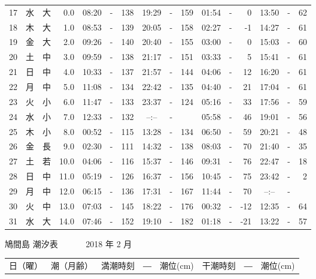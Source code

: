 \documentclass[12pt.a4j]{jsarticle}
\begin{document}
\begin{center}
\begin{table}[ht]
\begin{tabular}{|rc|cr|ccrccr|ccrccr|}
17 & 水 & 大 &  0.0 &  08:20 &-& 138  &  19:29 &-& 159  &   01:54 &-&   0  &   13:50 &-&  62  \\
18 & 木 & 大 &  1.0 &  08:53 &-& 139  &  20:05 &-& 158  &   02:27 &-&  -1  &   14:27 &-&  61  \\
19 & 金 & 大 &  2.0 &  09:26 &-& 140  &  20:40 &-& 155  &   03:00 &-&   0  &   15:03 &-&  60  \\
20 & 土 & 中 &  3.0 &  09:59 &-& 138  &  21:17 &-& 151  &   03:33 &-&   5  &   15:41 &-&  61  \\
21 & 日 & 中 &  4.0 &  10:33 &-& 137  &  21:57 &-& 144  &   04:06 &-&  12  &   16:20 &-&  61  \\
22 & 月 & 中 &  5.0 &  11:08 &-& 134  &  22:42 &-& 135  &   04:40 &-&  21  &   17:04 &-&  61  \\
23 & 火 & 小 &  6.0 &  11:47 &-& 133  &  23:37 &-& 124  &   05:16 &-&  33  &   17:56 &-&  59  \\
24 & 水 & 小 &  7.0 &  12:33 &-& 132  &  --:-- &-&     &   05:58 &-&  46  &   19:01 &-&  56  \\
25 & 木 & 小 &  8.0 &  00:52 &-& 115  &  13:28 &-& 134  &   06:50 &-&  59  &   20:21 &-&  48  \\
26 & 金 & 長 &  9.0 &  02:30 &-& 111  &  14:32 &-& 138  &   08:03 &-&  70  &   21:40 &-&  35  \\
27 & 土 & 若 & 10.0 &  04:06 &-& 116  &  15:37 &-& 146  &   09:31 &-&  76  &   22:47 &-&  18  \\
28 & 日 & 中 & 11.0 &  05:19 &-& 126  &  16:37 &-& 156  &   10:45 &-&  75  &   23:42 &-&   2  \\
29 & 月 & 中 & 12.0 &  06:15 &-& 136  &  17:31 &-& 167  &   11:44 &-&  70  &   --:-- &-&     \\
30 & 火 & 中 & 13.0 &  07:03 &-& 145  &  18:22 &-& 176  &   00:32 &-& -12  &   12:35 &-&  64  \\
31 & 水 & 大 & 14.0 &  07:46 &-& 152  &  19:10 &-& 182  &   01:18 &-& -21  &   13:22 &-&  57  \\
   \hline
   \end{tabular}
\end{table}
\newpage
 {\LARGE 鳩間島  潮汐表　　　}
 {\large 2018 年  2 月}\\
 \begin{table}[ht]
    \begin{tabular}{|rc|cr|ccrccr|ccrccr|}
    \hline
    \multicolumn{2}{|c|}{日（曜）} & \multicolumn{2}{c|}{潮（月齢）} & \multicolumn{6}{c|}{満潮時刻　―　潮位(cm)} & \multicolumn{6}{c|}{干潮時刻　―　潮位(cm)} \\

\end{tabular}
\end{table}
\end{center}
\end{document}
